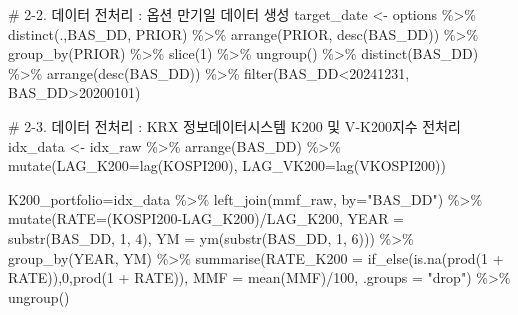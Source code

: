 \documentclass[
  a4paper,
  DIV=11,
  numbers=noendperiod]{scrreprt}
\newenvironment{Shaded}{\begin{snugshade}}{\end{snugshade}}
\newcommand{\AttributeTok}[1]{\textcolor[rgb]{0.40,0.45,0.13}{#1}}
\newcommand{\CommentTok}[1]{\textcolor[rgb]{0.37,0.37,0.37}{#1}}
\newcommand{\DecValTok}[1]{\textcolor[rgb]{0.68,0.00,0.00}{#1}}
\newcommand{\FunctionTok}[1]{\textcolor[rgb]{0.28,0.35,0.67}{#1}}
\newcommand{\NormalTok}[1]{\textcolor[rgb]{0.00,0.23,0.31}{#1}}
\newcommand{\OtherTok}[1]{\textcolor[rgb]{0.00,0.23,0.31}{#1}}
\newcommand{\SpecialCharTok}[1]{\textcolor[rgb]{0.37,0.37,0.37}{#1}}
\newcommand{\StringTok}[1]{\textcolor[rgb]{0.13,0.47,0.30}{#1}}
\begin{document}
\begin{Shaded}
\begin{Highlighting}[]
\CommentTok{\# 2{-}2. 데이터 전처리 : 옵션 만기일 데이터 생성}
\NormalTok{target\_date }\OtherTok{\textless{}{-}}\NormalTok{ options }\SpecialCharTok{\%\textgreater{}\%} 
  \FunctionTok{distinct}\NormalTok{(.,BAS\_DD, PRIOR) }\SpecialCharTok{\%\textgreater{}\%} 
  \FunctionTok{arrange}\NormalTok{(PRIOR, }\FunctionTok{desc}\NormalTok{(BAS\_DD)) }\SpecialCharTok{\%\textgreater{}\%} 
  \FunctionTok{group\_by}\NormalTok{(PRIOR) }\SpecialCharTok{\%\textgreater{}\%} 
  \FunctionTok{slice}\NormalTok{(}\DecValTok{1}\NormalTok{) }\SpecialCharTok{\%\textgreater{}\%} 
  \FunctionTok{ungroup}\NormalTok{() }\SpecialCharTok{\%\textgreater{}\%} 
  \FunctionTok{distinct}\NormalTok{(BAS\_DD) }\SpecialCharTok{\%\textgreater{}\%} 
  \FunctionTok{arrange}\NormalTok{(}\FunctionTok{desc}\NormalTok{(BAS\_DD)) }\SpecialCharTok{\%\textgreater{}\%} 
  \FunctionTok{filter}\NormalTok{(BAS\_DD}\SpecialCharTok{\textless{}}\DecValTok{20241231}\NormalTok{, BAS\_DD}\SpecialCharTok{\textgreater{}}\DecValTok{20200101}\NormalTok{)}

\CommentTok{\# 2{-}3. 데이터 전처리 : KRX 정보데이터시스템 K200 및 V{-}K200지수 전처리}
\NormalTok{idx\_data }\OtherTok{\textless{}{-}}\NormalTok{ idx\_raw }\SpecialCharTok{\%\textgreater{}\%}
  \FunctionTok{arrange}\NormalTok{(BAS\_DD) }\SpecialCharTok{\%\textgreater{}\%} 
  \FunctionTok{mutate}\NormalTok{(}\AttributeTok{LAG\_K200=}\FunctionTok{lag}\NormalTok{(KOSPI200),}
         \AttributeTok{LAG\_VK200=}\FunctionTok{lag}\NormalTok{(VKOSPI200))}

\NormalTok{K200\_portfolio}\OtherTok{=}\NormalTok{idx\_data }\SpecialCharTok{\%\textgreater{}\%} 
  \FunctionTok{left\_join}\NormalTok{(mmf\_raw, }\AttributeTok{by=}\StringTok{"BAS\_DD"}\NormalTok{) }\SpecialCharTok{\%\textgreater{}\%} 
  \FunctionTok{mutate}\NormalTok{(}\AttributeTok{RATE=}\NormalTok{(KOSPI200}\SpecialCharTok{{-}}\NormalTok{LAG\_K200)}\SpecialCharTok{/}\NormalTok{LAG\_K200,}
         \AttributeTok{YEAR =} \FunctionTok{substr}\NormalTok{(BAS\_DD, }\DecValTok{1}\NormalTok{, }\DecValTok{4}\NormalTok{),}
         \AttributeTok{YM =} \FunctionTok{ym}\NormalTok{(}\FunctionTok{substr}\NormalTok{(BAS\_DD, }\DecValTok{1}\NormalTok{, }\DecValTok{6}\NormalTok{))) }\SpecialCharTok{\%\textgreater{}\%}
  \FunctionTok{group\_by}\NormalTok{(YEAR, YM) }\SpecialCharTok{\%\textgreater{}\%}
  \FunctionTok{summarise}\NormalTok{(}\AttributeTok{RATE\_K200 =} \FunctionTok{if\_else}\NormalTok{(}\FunctionTok{is.na}\NormalTok{(}\FunctionTok{prod}\NormalTok{(}\DecValTok{1} \SpecialCharTok{+}\NormalTok{ RATE)),}\DecValTok{0}\NormalTok{,}\FunctionTok{prod}\NormalTok{(}\DecValTok{1} \SpecialCharTok{+}\NormalTok{ RATE)),}
            \AttributeTok{MMF =} \FunctionTok{mean}\NormalTok{(MMF)}\SpecialCharTok{/}\DecValTok{100}\NormalTok{,}
            \AttributeTok{.groups =} \StringTok{"drop"}\NormalTok{) }\SpecialCharTok{\%\textgreater{}\%}
  \FunctionTok{ungroup}\NormalTok{()}


\end{Highlighting}
\end{Shaded}
\end{document}
